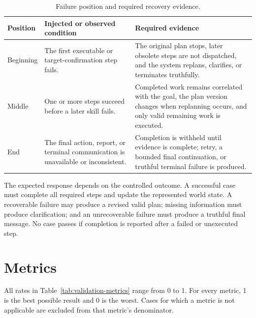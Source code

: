 \begin{table}[H]
\centering
\small
\renewcommand{\arraystretch}{1.14}
\caption{Failure position and required recovery evidence.}
\label{tab:failure-stage-methodology}
\begin{tabularx}{\textwidth}{@{}>{\RaggedRight\arraybackslash}p{}>{\RaggedRight\arraybackslash}p{}>{\RaggedRight\arraybackslash}X@{}}
\toprule
\textbf{Position} & \textbf{Injected or observed condition} & \textbf{Required evidence}\\
\midrule
Beginning & The first executable or target-confirmation step fails. & The original plan stops, later obsolete steps are not dispatched, and the system replans, clarifies, or terminates truthfully.\\
Middle & One or more steps succeed before a later skill fails. & Completed work remains correlated with the goal, the plan version changes when replanning occurs, and only valid remaining work is executed.\\
End & The final action, report, or terminal communication is unavailable or inconsistent. & Completion is withheld until evidence is complete; retry, a bounded final continuation, or truthful terminal failure is produced.\\
\bottomrule
\end{tabularx}
\end{table}

The expected response depends on the controlled outcome. A successful case must complete all required steps and update the represented world state. A recoverable failure may produce a revised valid plan; missing information must produce clarification; and an unrecoverable failure must produce a truthful final message. No case passes if completion is reported after a failed or unexecuted step.

\section{Metrics}

All rates in Table~\ref{tab:validation-metrics} range from 0 to 1. For every metric, 1 is the best possible result and 0 is the worst. Cases for which a metric is not applicable are excluded from that metric's denominator.

